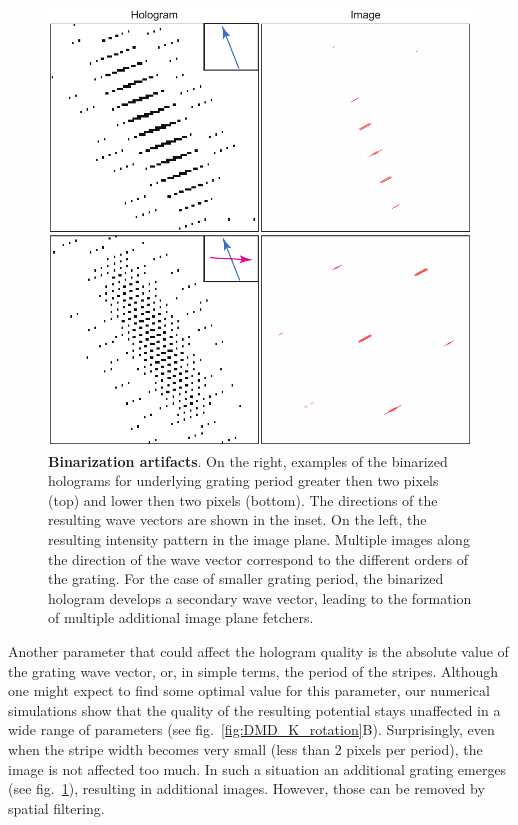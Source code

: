 \begin{figure}[t]
	\centering
	\includegraphics[scale=1]{figures/DMD_grating_bad_angle.pdf}
	\caption{{\bf Binarization artifacts}. On the right, examples of the binarized holograms for underlying grating period greater then two pixels (top) and lower then two pixels (bottom). The directions of the resulting wave vectors are shown in the inset.  On the left, the resulting intensity pattern in the image plane. Multiple images along the direction of the wave vector correspond to the different orders of the grating. For the case of smaller grating period, the binarized hologram develops a secondary wave vector, leading to the formation of multiple additional image plane fetchers.}
	\label{fig:DMD_grating_bad_angle}
\end{figure}

Another parameter that could affect the hologram quality is the absolute value of the grating wave vector, or, in simple terms, the period of the stripes. Although one might expect to find some optimal value for this parameter, our numerical simulations show that the quality of the resulting potential stays unaffected in a wide range of parameters (see fig.~\ref{fig:DMD_K_rotation}B). Surprisingly, even when the stripe width becomes very small (less than $2$ pixels per period),  the image is not affected too much. In such a situation an additional grating emerges (see fig.~\ref{fig:DMD_grating_bad_angle}), resulting in additional images. However, those can be removed by spatial filtering.
 
